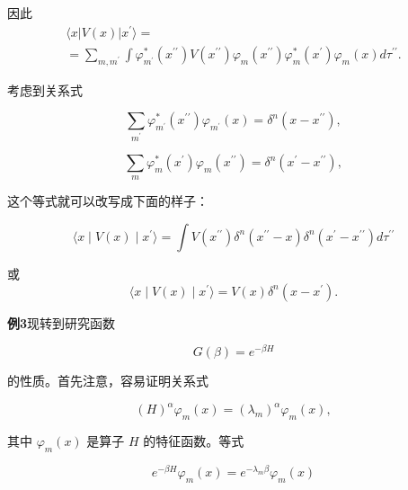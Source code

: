 因此
\begin{equation*}
\begin{array}{l} \langle x | V (x) | x ^ {\prime} \rangle = \\ = \sum_ {m, m ^ {\prime}} \int \varphi_ {m ^ {\prime}} ^ {*} (x ^ {\prime \prime}) V (x ^ {\prime \prime}) \varphi_ {m} (x ^ {\prime \prime}) \varphi_ {m} ^ {*} (x ^ {\prime}) \varphi_ {m} (x) d \tau^ {\prime \prime}. \end{array}
\end{equation*}

考虑到关系式

\begin{equation*}
\sum_ {m ^ {\prime}} \varphi_ {m ^ {\prime}} ^ {*} (x ^ {\prime \prime}) \varphi_ {m ^ {\prime}} (x) = \delta^ {n} (x - x ^ {\prime \prime}),
\end{equation*}

\begin{equation*}
\sum_ {m} \varphi_ {m} ^ {*} (x ^ {\prime}) \varphi_ {m} (x ^ {\prime \prime}) = \delta^ {n} (x ^ {\prime} - x ^ {\prime \prime}),
\end{equation*}

这个等式就可以改写成下面的样子：

\begin{equation*}
\langle x \mid V (x) \mid x ^ {\prime} \rangle = \int V (x ^ {\prime \prime}) \delta^ {n} (x ^ {\prime \prime} - x) \delta^ {n} (x ^ {\prime} - x ^ {\prime \prime}) d \tau^ {\prime \prime}
\end{equation*}

或
\begin{equation*}
\langle x \mid V (x) \mid x ^ {\prime} \rangle = V (x) \delta^ {n} (x - x ^ {\prime}).
\end{equation*}

\textbf{例3}\quad 现转到研究函数

\begin{equation*}
G (\beta) = e ^ {- \beta H}
\end{equation*}

的性质。首先注意，容易证明关系式

\begin{equation*}
(H) ^ {\alpha} \varphi_ {m} (x) = (\lambda_ {m}) ^ {\alpha} \varphi_ {m} (x),
\end{equation*}

其中 $\varphi_{m}(x)$ 是算子 $H$ 的特征函数。等式

\begin{equation*}
e ^ {- \beta H} \varphi_ {m} (x) = e ^ {- \lambda_ {m} \beta} \varphi_ {m} (x)
\end{equation*}

